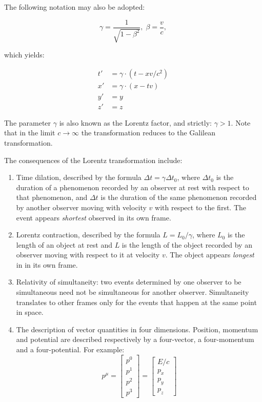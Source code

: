 The following notation may also be adopted:

\begin{equation*}
    \gamma = \frac{1}{\sqrt{1 - \beta^2}},\; \beta=\frac{v}{c},
\end{equation*}

which yields:

\begin{align*}
    t' &= \gamma\cdot(t-xv/c^2) \\
    x' &= \gamma\cdot(x-tv) \\
    y' &= y \\
    z' &= z
\end{align*}

The parameter $\gamma$ is also known as the Lorentz factor, and strictly: $\gamma > 1$. Note that in the limit $c \xrightarrow{} \infty$ the transformation reduces to the Galilean transformation.

The consequences of the Lorentz transformation include:
\begin{enumerate}
    \item Time dilation, described by the formula $\Delta t = \gamma\Delta t_0$, where $\Delta t_0$ is the duration of a phenomenon recorded by an observer at rest with respect to that phenomenon, and $\Delta t$ is the duration of the same phenomenon recorded by another observer moving with velocity $v$ with respect to the first. The event appears \textit{shortest} observed in its own frame.
    \item Lorentz contraction, described by the formula $L = {L_0}/{\gamma}$, where $L_0$ is the length of an object at rest and $L$ is the length of the object recorded by an observer moving with respect to it at velocity $v$. The object appears \textit{longest} in in its own frame.
    \item Relativity of simultaneity: two events determined by one observer to be simultaneous need not be simultaneous for another observer. Simultaneity translates to other frames only for the events that happen at the same point in space.
    \item The description of vector quantities in four dimensions. Position, momentum and potential are described respectively by a four-vector, a four-momentum and a four-potential. For example:
    \begin{equation*}
        p^{\mu} =
        \begin{bmatrix}
            p^{0} \\ p^{1} \\ p^{2} \\ p^{3}
        \end{bmatrix}
        =
        \begin{bmatrix}
            E/c \\ p_x \\ p_y \\ p_z
        \end{bmatrix}
    \end{equation*}
    
\end{enumerate}

